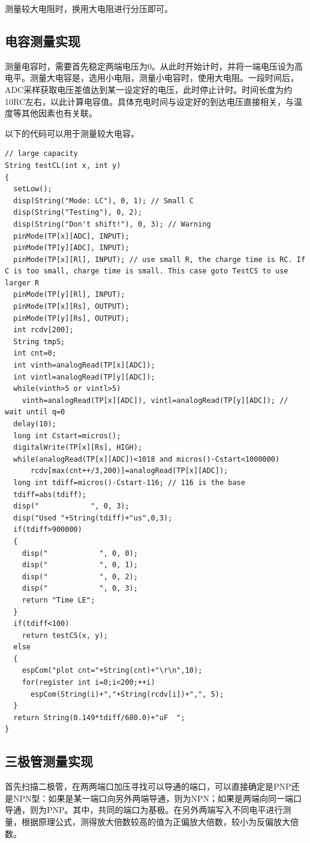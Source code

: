 \documentclass[a4paper]{article}
\begin{document}
	测量较大电阻时，换用大电阻进行分压即可。
	\subsection{电容测量实现}
	测量电容时，需要首先稳定两端电压为0。从此时开始计时，并将一端电压设为高电平。测量大电容是，选用小电阻，测量小电容时，使用大电阻。一段时间后，ADC采样获取电压差值达到某一设定好的电压，此时停止计时。时间长度为约10RC左右，以此计算电容值。具体充电时间与设定好的到达电压直接相关，与温度等其他因素也有关联。

    以下的代码可以用于测量较大电容。
\begin{lstlisting}
// large capacity
String testCL(int x, int y)
{ 
  setLow();
  disp(String("Mode: LC"), 0, 1); // Small C
  disp(String("Testing"), 0, 2);
  disp(String("Don't shift!"), 0, 3); // Warning
  pinMode(TP[x][ADC], INPUT);
  pinMode(TP[y][ADC], INPUT);
  pinMode(TP[x][Rl], INPUT); // use small R, the charge time is RC. If C is too small, charge time is small. This case goto TestCS to use larger R
  pinMode(TP[y][Rl], INPUT);
  pinMode(TP[x][Rs], OUTPUT);
  pinMode(TP[y][Rs], OUTPUT);
  int rcdv[200];
  String tmpS;
  int cnt=0;
  int vinth=analogRead(TP[x][ADC]);
  int vintl=analogRead(TP[y][ADC]);
  while(vinth>5 or vintl>5)
    vinth=analogRead(TP[x][ADC]), vintl=analogRead(TP[y][ADC]); // wait until q=0
  delay(10);
  long int Cstart=micros();
  digitalWrite(TP[x][Rs], HIGH);
  while(analogRead(TP[x][ADC])<1018 and micros()-Cstart<1000000)
      rcdv[max(cnt++/3,200)]=analogRead(TP[x][ADC]);
  long int tdiff=micros()-Cstart-116; // 116 is the base 
  tdiff=abs(tdiff);
  disp("            ", 0, 3);
  disp("Used "+String(tdiff)+"us",0,3);
  if(tdiff>900000)
  {
    disp("            ", 0, 0);
    disp("            ", 0, 1);
    disp("            ", 0, 2);
    disp("            ", 0, 3);
    return "Time LE";
  }
  if(tdiff<100)
    return testCS(x, y);
  else
  {
    espCom("plot cnt="+String(cnt)+"\r\n",10);
    for(register int i=0;i<200;++i)
      espCom(String(i)+","+String(rcdv[i])+",", 5);
  }
  return String(0.149*tdiff/680.0)+"uF  ";
}
\end{lstlisting}
	
	\subsection{三极管测量实现}
	首先扫描二极管，在两两端口加压寻找可以导通的端口，可以直接确定是PNP还是NPN型：如果是某一端口向另外两端导通，则为NPN；如果是两端向同一端口导通，则为PNP。其中，共同的端口为基极。在另外两端写入不同电平进行测量，根据原理公式，测得放大倍数较高的值为正偏放大倍数，较小为反偏放大倍数。
	
\end{document}
